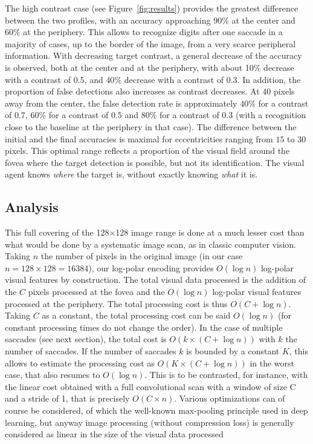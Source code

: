 The high contrast case (see Figure~\ref{fig:results}) provides the greatest difference between the two profiles, with an accuracy approaching $90\%$ at the center and $60\%$ at the periphery. This allows to recognize digits after one saccade in a majority of cases, up to the border of the image, from a very scarce peripheral information. With decreasing target contrast, a general decrease of the accuracy is observed, both at the center and at the periphery, with about 10\% decrease with a contrast of $0.5$, and $40\%$ decrease with a contrast of $0.3$. In addition, the proportion of false detections also increases as contrast decreases. At $40$ pixels away from the center, the false detection rate is approximately $40\%$ for a contrast of $0.7$, $60\%$ for a contrast of $0.5$ and $80\%$ for a contrast of $0.3$ (with a recognition close to the baseline at the periphery in that case). The difference between the initial and the final accuracies is maximal for eccentricities ranging from $15$ to $30$ pixels. This optimal range reflects a proportion of the visual field around the fovea where the target detection is possible, but not its identification. The visual agent knows \emph{where} the target is, without exactly knowing \emph{what} it is.

\subsection{Analysis}
This full covering of the 128$\times$128 image range is done at a much lesser cost than what would be done by a systematic image scan, as in classic computer vision. Taking $n$ the number of pixels in the original image (in our case $n=128\times128=16384$), our log-polar encoding provides $O(\log n)$ log-polar visual features by construction. The total visual data processed is the addition of the $C$ pixels processed at the fovea and the $O(\log n)$ log-polar visual features processed at the periphery. The total processing cost is thus $O(C+\log n)$. Taking $C$ as a constant, the total processing cost can be said $O(\log n)$ (for constant processing times do not change the order).
In the case of multiple saccades (see next section), the total cost is $O(k\times(C+\log n))$ with $k$ the number of saccades. If the number of saccades $k$ is bounded by a constant $K$, this allows to estimate the processing cost as $O(K\times(C+\log n))$ in the worst case, that also resumes to $O(\log n)$.
This is to be contrasted, for instance, with the linear cost obtained with a full convolutional scan with a window of size C and a stride of 1, that is precisely $O(C\times n)$. Various optimizations can of course be considered, of which the well-known max-pooling principle used in deep learning, but anyway
image processing (without compression loss) is generally considered as linear in the size of the visual data processed \cite{strengert2006pyramid}

